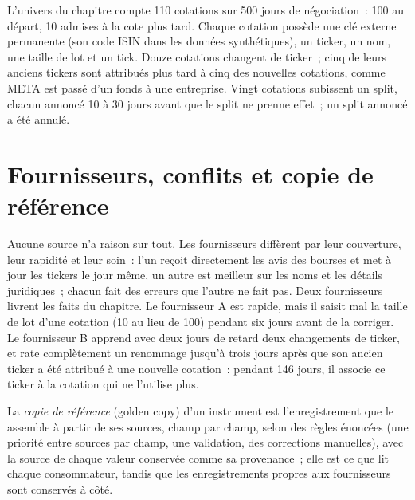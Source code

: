 L'univers du chapitre compte 110 cotations sur 500 jours de négociation~: 100 au départ, 10 admises à la cote plus tard. Chaque cotation possède une clé externe
permanente (son code ISIN dans les données synthétiques), un ticker, un nom, une taille de lot et un tick. Douze cotations changent de ticker~; cinq de leurs anciens
tickers sont attribués plus tard à cinq des nouvelles cotations, comme META est passé d'un fonds à une entreprise. Vingt cotations subissent un split, chacun
annoncé 10 à 30 jours avant que le split ne prenne effet~; un split annoncé a été annulé.

\section{Fournisseurs, conflits et copie de référence}

Aucune source n'a raison sur tout. Les fournisseurs diffèrent par leur couverture, leur rapidité et leur soin~: l'un reçoit directement les
avis des bourses et met à jour les tickers le jour même, un autre est meilleur sur les noms et les détails juridiques~; chacun fait des erreurs que l'autre ne fait pas.
Deux fournisseurs livrent les faits du chapitre. Le fournisseur A est rapide, mais il saisit mal la taille de lot d'une cotation (10 au lieu de 100) pendant six
jours avant de la corriger. Le fournisseur B apprend avec deux jours de retard deux changements de ticker, et rate complètement un renommage jusqu'à trois jours
après que son ancien ticker a été attribué à une nouvelle cotation~: pendant 146 jours, il associe ce ticker à la cotation qui ne l'utilise plus.

\begin{definition}\label{def:pl:reference-data-and-symbology-services:golden}
La \emph{copie de référence} (golden copy) d'un instrument est l'enregistrement que le  assemble à partir de ses sources,
champ par champ, selon des règles énoncées (une priorité entre sources par champ, une validation, des corrections manuelles), avec la source de chaque
valeur conservée comme sa provenance~; elle est ce que lit chaque consommateur, tandis que les enregistrements propres aux fournisseurs sont conservés à côté.
\end{definition}

\label{lst:pl:reference-data-and-symbology-services:golden}

